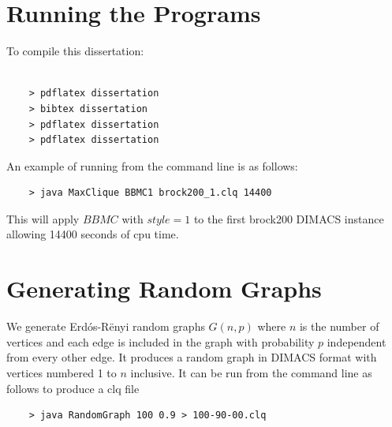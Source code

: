 \documentclass{l4proj}
\begin{document}
\begin{appendices}
\chapter{Running the Programs}

To compile this dissertation:
\begin{verbatim}

	> pdflatex dissertation
	> bibtex dissertation
	> pdflatex dissertation
    > pdflatex dissertation

\end{verbatim}


An example of running from the command line is as follows:
\begin{verbatim}
	> java MaxClique BBMC1 brock200_1.clq 14400
\end{verbatim}
This will apply $BBMC$ with $style = 1$ to the first brock200 DIMACS instance allowing 14400 seconds of cpu time.

\chapter{Generating Random Graphs}
\label{sec:randomGraph}
We generate Erd\'{o}s-R\"{e}nyi random graphs $G(n,p)$ where $n$ is the number of vertices and
each edge is included in the graph with probability $p$ independent from every other edge. It produces
a random graph in DIMACS format with vertices numbered 1 to $n$ inclusive. It can be run from the command line as follows to produce
a clq file
\begin{verbatim}
	> java RandomGraph 100 0.9 > 100-90-00.clq
\end{verbatim}
\end{appendices}




\end{document}
